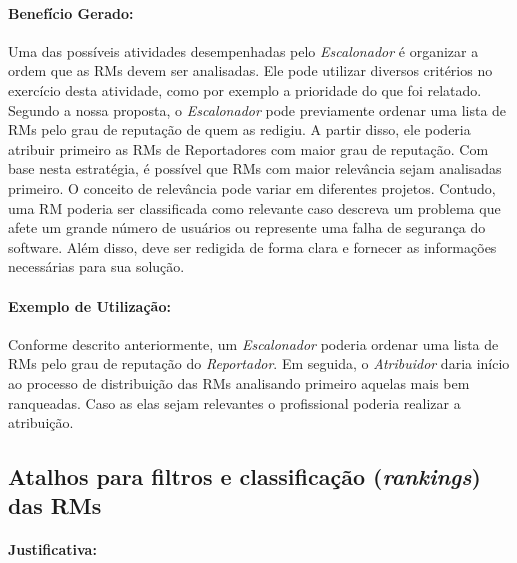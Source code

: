 \paragraph{Benefício Gerado:}\label{par:papéis_afetados_s03}

Uma das possíveis atividades desempenhadas pelo \textit{Escalonador} é
organizar a ordem que as RMs devem ser analisadas. Ele pode utilizar diversos
critérios no exercício desta atividade, como por exemplo a prioridade do que
foi relatado. Segundo a nossa proposta, o \textit{Escalonador} pode previamente
ordenar uma lista de RMs pelo grau de reputação de quem as redigiu. A partir
disso, ele poderia atribuir primeiro as RMs de Reportadores com maior grau de
reputação. Com base nesta estratégia, é possível que RMs com maior relevância
sejam analisadas primeiro. O conceito de relevância pode variar em diferentes
projetos. Contudo, uma RM poderia ser classificada como relevante caso descreva
um problema que afete um grande número de usuários ou represente uma falha de
segurança do software. Além disso, deve ser redigida de forma clara e fornecer
as informações necessárias para sua solução.

\paragraph{Exemplo de Utilização:}\label{par:exemplo_de_utilização_s03}

Conforme descrito anteriormente, um \textit{Escalonador} poderia ordenar uma
lista de RMs pelo grau de reputação do \textit{Reportador}. Em seguida, o
\textit{Atribuidor}  daria início ao processo de distribuição das RMs
analisando primeiro aquelas mais bem ranqueadas. Caso as elas sejam relevantes
o profissional poderia realizar a atribuição.

\subsection{Atalhos para filtros e classificação (\textit{rankings}) das RMs}\label{sub:histórico_das_ùltimas_rm_s}


\paragraph{Justificativa:}\label{par:justificativa_s04}

